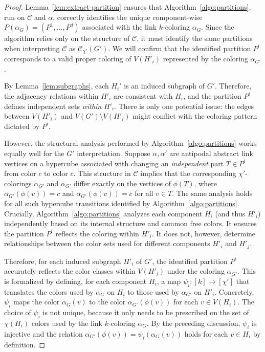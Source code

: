 \documentclass{amsart}
\theoremstyle{hypothesisstyle}
\theoremstyle{definition}
\theoremstyle{remark}
\numberwithin{equation}{section}
\begin{document}
\begin{proof}
Lemma~\ref{lem:extract-partition} ensures that Algorithm~\ref{algo:partitions}, run on $\mathcal{C}$ and $\alpha$, correctly identifies the unique component-wise $P(\alpha_{G}) = (P^1, \dots, P^d)$ associated with the link $k$-coloring $\alpha_G$. Since the algorithm relies only on the structure of $\mathcal{C}$, it must identify the same partitions when interpreting $\mathcal{C}$ as $\mathcal{C}_{\chi'}(G')$. We will confirm that the identified partition $P^i$ corresponds to a valid proper coloring of $V(H'_i)$ represented by the coloring $\alpha_{G'}$.


By Lemma~\ref{lem:subgraphs}, each $H_i'$  is an induced subgraph of $G'$. Therefore, the adjacency relations within $H'_i$ are consistent with $H_i$, and the partition $P^i$ defines independent sets \emph{within} $H'_i$. There is only one potential issue: the edges between $V(H'_i)$ and $V(G')\setminus V(H'_i)$ might conflict with the coloring pattern dictated by $P^i$.

However, the structural analysis performed by Algorithm~\ref{algo:partitions} works equally well for the $G'$ interpretation. Suppose $\alpha, \alpha'$ are antipodal abstract link vertices on a hypercube associated with changing an \emph{independent} part $T\in P^i$ from color $c$ to color $\overline{c}$. This structure in $\mathcal{C}$ implies that the corresponding $\chi'$-colorings $\alpha_{G'}$ and $\overline{\alpha}_{G'}$ differ exactly on the vertices of $\phi(T)$, where $\alpha_{G'}(\phi(v))=c$ and $\overline{\alpha}_{G'}(\phi(v))=\overline{c}$ for all $v\in T$. The same analysis holds for all such hypercube transitions identified by Algorithm~\ref{algo:partitions}. Crucially, Algorithm~\ref{algo:partitions} analyzes each component $H_i$ (and thus $H'_i$) independently based on its internal structure and common free colors. It ensures the partition $P^i$ reflects the coloring within $H'_i$. It does not, however, determine relationships between the color sets used for different components $H'_i$ and $H'_j$.

Therefore, for each induced subgraph $H'_i$ of $G'$, the identified partition $P^i$ accurately reflects the color classes within $V(H'_i)$ under the coloring $\alpha_{G'}$. This is formalized by defining, for each component $H_i$, a map $\psi_i\colon [k]\to [\chi']$ that translates the colors used by $\alpha_{G}$ on $H_i$ to those used by $\alpha_{G'}$ on $H'_i$. Concretely, $\psi_i$ maps the color $\alpha_{G}(v)$ to the color $\alpha_{G'}(\phi(v))$ for each $v\in V(H_i)$. The choice of $\psi_i$ is not unique, because it only needs to be prescribed on the set of $\chi(H_i)$ colors used by the link $k$-coloring $\alpha_G$. By the preceding discussion, $\psi_i$ is injective and the relation $\alpha_{G'}\left(\phi(v)\right)=\psi_i(\alpha_{G}(v))$ holds for each $v\in H_i$ by definition.
\end{proof}
\end{document}
